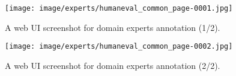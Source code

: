 


\begin{figure*}
    \centering
    \texttt{[image: image/experts/humaneval\_common\_page-0001.jpg]}
    \caption{A web UI screenshot for domain experts annotation (1/2).}
    \label{fig:experts-webui-1}
\end{figure*}

\begin{figure*}
    \centering
    \texttt{[image: image/experts/humaneval\_common\_page-0002.jpg]}
    \caption{A web UI screenshot for domain experts annotation (2/2).}
    \label{fig:experts-webui-2}
\end{figure*}

